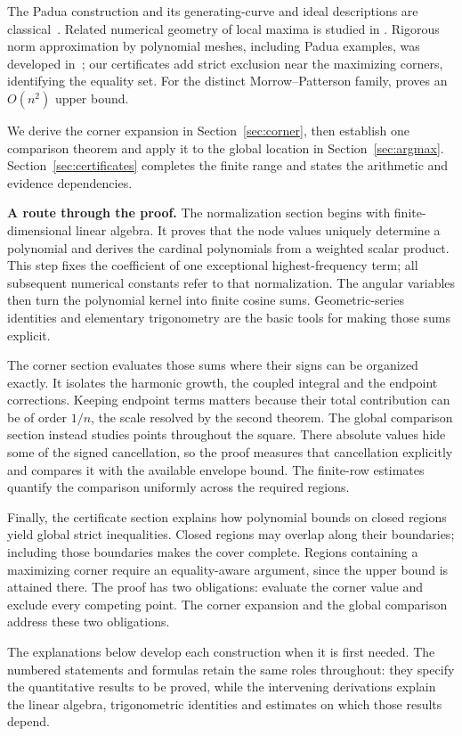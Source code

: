 The Padua construction and its generating-curve and ideal descriptions
are classical~\cite{BosCaliariDeMarchiVianelloXu2006,BosDeMarchiVianelloXu2007}.
Related numerical geometry of local maxima is studied in
\cite{BialasCiezDeMarchiSuder2026}. Rigorous norm approximation by polynomial
meshes, including Padua examples, was developed in~\cite{Mesh2024}; our
certificates add strict exclusion near the maximizing corners, identifying
the equality set.
For the distinct Morrow--Patterson family,
\cite{MorrowPatterson2026} proves an $O(n^2)$ upper bound.

We derive the corner expansion in Section~\ref{sec:corner}, then establish
one comparison theorem and apply it to the global location in
Section~\ref{sec:argmax}. Section~\ref{sec:certificates} completes the finite
range and states the arithmetic and evidence dependencies.


\noindent\textbf{A route through the proof.}
The normalization section begins with finite-dimensional linear algebra.
It proves that the node values uniquely determine a polynomial and
derives the cardinal polynomials from a weighted scalar product. This
step fixes the coefficient of one exceptional highest-frequency term;
all subsequent numerical constants refer to that normalization.
The angular variables then turn the polynomial kernel into finite cosine
sums. Geometric-series identities and elementary trigonometry are the
basic tools for making those sums explicit.

The corner section evaluates those sums where their signs can be
organized exactly. It isolates the harmonic growth, the coupled integral
and the endpoint corrections. Keeping endpoint terms matters because
their total contribution can be of order $1/n$, the scale resolved by
the second theorem. The global comparison section instead studies
points throughout the square. There absolute values hide some of the
signed cancellation, so the proof measures that cancellation explicitly
and compares it with the available envelope bound. The finite-row
estimates quantify the comparison uniformly across the required regions.

Finally, the certificate section explains how polynomial bounds on
closed regions yield global strict inequalities. Closed regions may
overlap along their boundaries; including those boundaries makes the
cover complete. Regions containing a maximizing corner require an
equality-aware argument, since the upper bound is attained there.
The proof has two obligations: evaluate the corner value and exclude
every competing point. The corner expansion and the global comparison
address these two obligations.

The explanations below develop each construction when it is first
needed. The numbered statements and formulas retain the same roles
throughout: they specify the quantitative results to be proved, while
the intervening derivations explain the linear algebra, trigonometric
identities and estimates on which those results depend.
